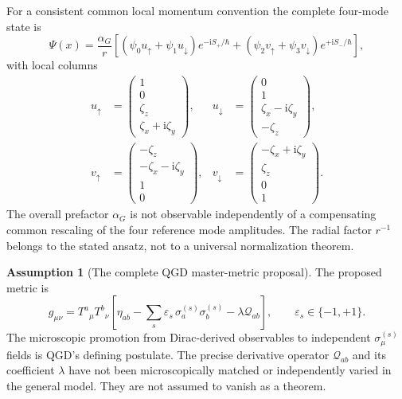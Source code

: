 \documentclass[11pt,a4paper,oneside]{report}
\numberwithin{equation}{chapter}
\theoremstyle{definition}\newtheorem{definition}[theorem]{Definition}
\newtheorem{assumption}[theorem]{Assumption}
\theoremstyle{remark}\newtheorem{remark}[theorem]{Remark}
\newcommand{\ii}{\mathrm i}
\begin{document}
For a consistent common local momentum convention the complete four-mode state is
\begin{equation}
\boxed{\displaystyle
\Psi(x)=\frac{\alpha_G}{r}\left[
(\psi_0u_{\uparrow}+\psi_1u_{\downarrow})e^{-\ii S_+/\hbar}
+(\psi_2v_{\uparrow}+\psi_3v_{\downarrow})e^{+\ii S_-/\hbar}
\right],}
\label{eq:fourmode}
\end{equation}
with local columns
\begin{equation}
\begin{aligned}
 u_{\uparrow}&=\begin{pmatrix}1\\0\\\zeta_z\\\zeta_x+\ii\zeta_y\end{pmatrix},&
 u_{\downarrow}&=\begin{pmatrix}0\\1\\\zeta_x-\ii\zeta_y\\-\zeta_z\end{pmatrix},\\
 v_{\uparrow}&=\begin{pmatrix}-\zeta_z\\-\zeta_x-\ii\zeta_y\\1\\0\end{pmatrix},&
 v_{\downarrow}&=\begin{pmatrix}-\zeta_x+\ii\zeta_y\\\zeta_z\\0\\1\end{pmatrix}.
\end{aligned}
\label{eq:columns}
\end{equation}
The overall prefactor $\alpha_G$ is not observable independently of a compensating common rescaling of the four reference mode amplitudes. The radial factor $r^{-1}$ belongs to the stated ansatz, not to a universal normalization theorem.

\begin{assumption}[The complete QGD master-metric proposal]\label{ass:metric}
The proposed metric is
\begin{equation}
\boxed{\displaystyle
 g_{\mu\nu}=T^a{}_{\mu}T^b{}_{\nu}
 \left[\eta_{ab}-\sum_{s}\varepsilon_s\,
 \sigma_a^{(s)}\sigma_b^{(s)}-\lambda\mathcal Q_{ab}\right],
 \qquad \varepsilon_s\in\{-1,+1\}.}
\label{eq:master}
\end{equation}
The microscopic promotion from Dirac-derived observables to independent $\sigma_{\mu}^{(s)}$ fields is QGD's defining postulate. The precise derivative operator $\mathcal Q_{ab}$ and its coefficient $\lambda$ have not been microscopically matched or independently varied in the general model. They are not assumed to vanish as a theorem.
\end{assumption}
\end{document}

